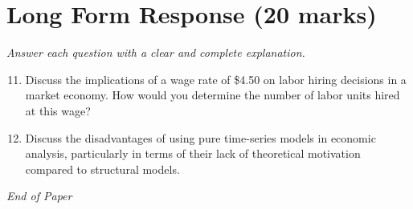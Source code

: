 \documentclass[12pt]{article}
\begin{document}
\section*{Long Form Response (20 marks)}
\textit{Answer each question with a clear and complete explanation.}
\begin{enumerate}[label=\arabic*.]
\setcounter{enumi}{10}
\item Discuss the implications of a wage rate of \$4.50 on labor hiring decisions in a market economy. How would you determine the number of labor units hired at this wage?
\item Discuss the disadvantages of using pure time-series models in economic analysis, particularly in terms of their lack of theoretical motivation compared to structural models.
\end{enumerate}

\vfill
\noindent\textit{End of Paper}
\end{document}
